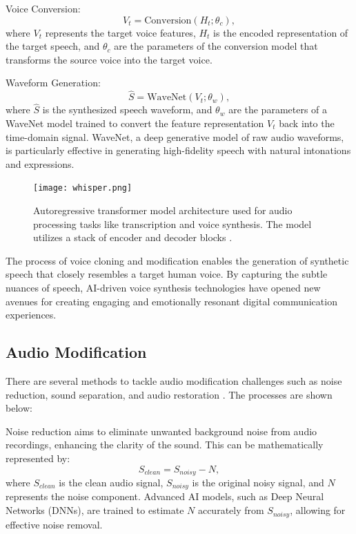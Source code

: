 \documentclass[11pt,a4paper,oneside]{report}
\begin{document}
Voice Conversion:
\begin{equation}
V_t = \text{Conversion}(H_t; \theta_c),
\end{equation}
where $V_t$ represents the target voice features, $H_t$ is the encoded representation of the target speech, and $\theta_c$ are the parameters of the conversion model that transforms the source voice into the target voice.

Waveform Generation:
\begin{equation}
\hat{S} = \text{WaveNet}(V_t; \theta_w),
\end{equation}
where $\hat{S}$ is the synthesized speech waveform, and $\theta_w$ are the parameters of a WaveNet \cite{oord2016wavenet} model trained to convert the feature representation $V_t$ back into the time-domain signal. WaveNet, a deep generative model of raw audio waveforms, is particularly effective in generating high-fidelity speech with natural intonations and expressions.

\begin{figure}[htbp]
  \centering
  \texttt{[image: whisper.png]}
  \caption{Autoregressive transformer model architecture used for audio processing tasks like transcription and voice synthesis. The model utilizes a stack of encoder and decoder blocks \cite{OpenAIWhisper}.}
\end{figure}

The process of voice cloning and modification enables the generation of synthetic speech that closely resembles a target human voice. 
By capturing the subtle nuances of speech, AI-driven voice synthesis technologies have opened new avenues for creating engaging and emotionally resonant digital communication experiences. 



\subsection{Audio Modification}

There are several methods to tackle audio modification challenges such as noise reduction, sound separation, and audio restoration \cite{godsill2002digital}. 
The processes are shown below:

Noise reduction aims to eliminate unwanted background noise from audio recordings, enhancing the clarity of the sound. This can be mathematically represented by:
\begin{equation}
S_{clean} = S_{noisy} - N,
\end{equation}
where $S_{clean}$ is the clean audio signal, $S_{noisy}$ is the original noisy signal, and $N$ represents the noise component. Advanced AI models, such as Deep Neural Networks (DNNs), are trained to estimate $N$ accurately from $S_{noisy}$, allowing for effective noise removal.
\end{document}

